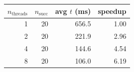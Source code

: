 \begin{tabular}{rrrr}
  \toprule
  $n_\mathrm{threads}$ & $n_\mathrm{succ}$ & avg $t$ (ms) & speedup \\
  \midrule
  1 & 20 & 656.5 & 1.00 \\
  2 & 20 & 221.9 & 2.96 \\
  4 & 20 & 144.6 & 4.54 \\
  8 & 20 & 106.0 & 6.19 \\
  \bottomrule
\end{tabular}
